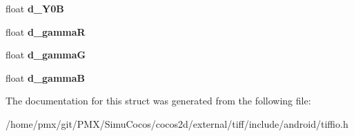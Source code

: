 \begin{DoxyCompactItemize}
float {\bfseries d\+\_\+\+Y0B}
\item 
\mbox{\label{structTIFFDisplay_a5d8c8f1c2c0941ae74e87b2e07f7ad19}} 
float {\bfseries d\+\_\+gammaR}
\item 
\mbox{\label{structTIFFDisplay_a11a58e28bb1b40f5e323429f70a73ab5}} 
float {\bfseries d\+\_\+gammaG}
\item 
\mbox{\label{structTIFFDisplay_ac95c758dda3637c6a7fc4eee36346126}} 
float {\bfseries d\+\_\+gammaB}
\end{DoxyCompactItemize}


The documentation for this struct was generated from the following file\+:\begin{DoxyCompactItemize}
\item 
/home/pmx/git/\+P\+M\+X/\+Simu\+Cocos/cocos2d/external/tiff/include/android/tiffio.\+h\end{DoxyCompactItemize}
